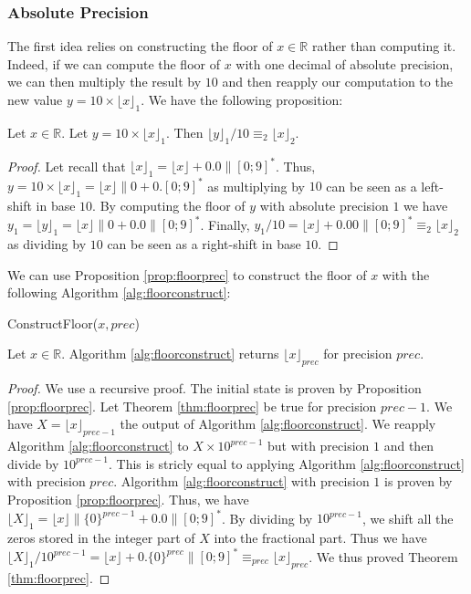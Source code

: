 \documentclass[runningheads]{llncs}
\begin{document}
\subsubsection{Absolute Precision} 
The first idea relies on constructing the floor of $x\in\mathbb{R}$ rather than computing it. Indeed, if we can compute the floor of $x$ with one decimal of absolute precision, we can then multiply the result by $10$ and then reapply our computation to the new value $y=10\times \lfloor x\rfloor_1$. We have the following proposition:
\begin{proposition}\label{prop:floorprec}
  Let $x\in\mathbb{R}$. Let $y = 10\times\lfloor x\rfloor_1$. Then $\lfloor y \rfloor_1 /10 \equiv_2 \lfloor x \rfloor_2$.
\end{proposition}
\begin{proof}
  Let recall that $\lfloor x \rfloor_1 = \lfloor x \rfloor + 0.0 \|[0;9]^*$. Thus, $y=10\times\lfloor x \rfloor_1=\lfloor x\rfloor\|0+0.[0;9]^*$ as multiplying by $10$ can be seen as a left-shift in base $10$. By computing the floor of $y$ with absolute precision $1$ we have $y_1=\lfloor y \rfloor_1 = \lfloor x \rfloor\|0 + 0.0\|[0;9]^*$. Finally, $ y_1/10 = \lfloor x \rfloor + 0.00\|[0;9]^*\equiv_2 \lfloor x \rfloor_2$ as dividing by $10$ can be seen as a right-shift in base $10$.  
\end{proof}
We can use Proposition \ref{prop:floorprec} to construct the floor of $x$ with the following Algorithm \ref{alg:floorconstruct}:

\begin{algorithm}[H]
  \caption{ConstructFloor($x,prec$)}
  \label{alg:floorconstruct}
\end{algorithm}

\begin{theorem}\label{thm:floorprec}
  Let $x\in\mathbb{R}$. Algorithm \ref{alg:floorconstruct} returns $\lfloor x \rfloor_{prec}$ for precision $prec$.
\end{theorem}
\begin{proof}
  We use a recursive proof. The initial state is proven by Proposition \ref{prop:floorprec}. Let Theorem \ref{thm:floorprec} be true for precision $prec-1$. We have $X=\lfloor x \rfloor_{prec-1}$ the output of Algorithm \ref{alg:floorconstruct}. We reapply Algorithm \ref{alg:floorconstruct} to $X\times 10^{prec-1}$ but with precision $1$ and then divide by $10^{prec-1}$. This is stricly equal to applying Algorithm \ref{alg:floorconstruct} with precision $prec$. Algorithm \ref{alg:floorconstruct} with precision $1$ is proven by Proposition \ref{prop:floorprec}. Thus, we have $\lfloor X \rfloor_1 = \lfloor x\rfloor \| \{0\}^{prec-1} + 0.0\|[0;9]^*$. By dividing by $10^{prec-1}$, we shift all the zeros stored in the integer part of $X$ into the fractional part. Thus we have $\lfloor X \rfloor_1 /10^{prec-1} = \lfloor x \rfloor + 0.\{0\}^{prec}\|[0;9]^* \equiv_{prec} \lfloor x \rfloor_{prec}$. We thus proved Theorem \ref{thm:floorprec}.
\end{proof}
 
\end{document}
